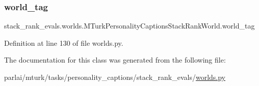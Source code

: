 \subsubsection{\texorpdfstring{world\+\_\+tag}{world\_tag}}
{\footnotesize\ttfamily stack\+\_\+rank\+\_\+evals.\+worlds.\+M\+Turk\+Personality\+Captions\+Stack\+Rank\+World.\+world\+\_\+tag}



Definition at line 130 of file worlds.\+py.



The documentation for this class was generated from the following file\+:\begin{DoxyCompactItemize}
\item 
parlai/mturk/tasks/personality\+\_\+captions/stack\+\_\+rank\+\_\+evals/\hyperlink{parlai_2mturk_2tasks_2personality__captions_2stack__rank__evals_2worlds_8py}{worlds.\+py}\end{DoxyCompactItemize}

